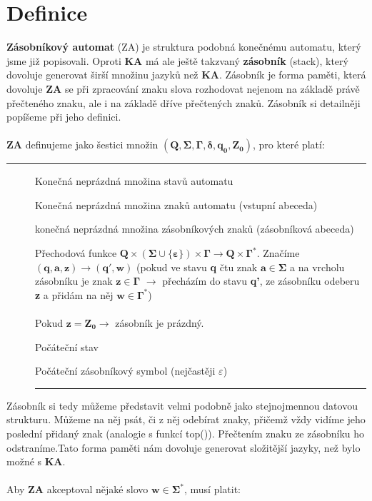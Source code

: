 \documentclass{report}
\begin{document}
\section{Definice}
\textbf{Zásobníkový automat} (ZA) je struktura podobná konečnému automatu, který jsme již popisovali. Oproti \textbf{KA} má ale ještě takzvaný \textbf{zásobník} (stack), který dovoluje generovat širší množinu jazyků než \textbf{KA}. Zásobník je forma paměti, která dovoluje \textbf{ZA} se při zpracování znaku slova rozhodovat nejenom na základě právě přečteného znaku, ale i na základě dříve přečtených znaků. Zásobník si detailněji popíšeme při jeho definici.\\ \\
\textbf{ZA} definujeme jako šestici množin $\mathbf{(Q, \Sigma, \Gamma, \delta, q_0, Z_0)}$, pro které platí:
\vspace{0.4cm}    
\hrule
\vspace{0.1cm}
\begin{description}
   \item[] Konečná neprázdná množina stavů automatu
   \item[\fbox{$\mathbf{\Sigma}$}] Konečná neprázdná množina znaků automatu (vstupní abeceda) 
   \item[\fbox{$\mathbf{\Gamma}$}] konečná neprázdná množina zásobníkových znaků (zásobníková abeceda)
   \item[\fbox{$\mathbf{\delta}$}] Přechodová funkce $\mathbf{Q \times (\Sigma \cup \{\varepsilon\}) \times \Gamma \rightarrow Q \times \Gamma^*}$. Značíme $\mathbf{(q,a,z) \rightarrow (q',w)}$ (pokud ve stavu \textbf{q} čtu znak $\mathbf{a \in \Sigma}$ a na vrcholu zásobníku je znak $\mathbf{z \in \Gamma}$ $\mathbf{\rightarrow}$ přecházím do stavu \textbf{q'}, ze zásobníku odeberu \textbf{z} a přidám na něj $\mathbf{w \in \Gamma^*}$)\\ \\Pokud $\mathbf{z=Z_0 \rightarrow}$ zásobník je prázdný.
   \item[] Počáteční stav
   \item[] Počáteční zásobníkový symbol (nejčastěji $\varepsilon$)
\vspace{0.1cm}    
\hrule
\vspace{0.4cm}
\end{description}
Zásobník si tedy můžeme představit velmi podobně jako stejnojmennou datovou strukturu. Můžeme na něj psát, či z něj odebírat znaky, přičemž vždy vidíme jeho poslední přidaný znak (analogie s funkcí top()). Přečtením znaku ze zásobníku ho odstraníme.Tato forma paměti nám dovoluje generovat složitější jazyky, než bylo možné s \textbf{KA}.\\ \\Aby \textbf{ZA} akceptoval nějaké slovo $\mathbf{w \in \Sigma^*}$, musí platit:
\end{document}

